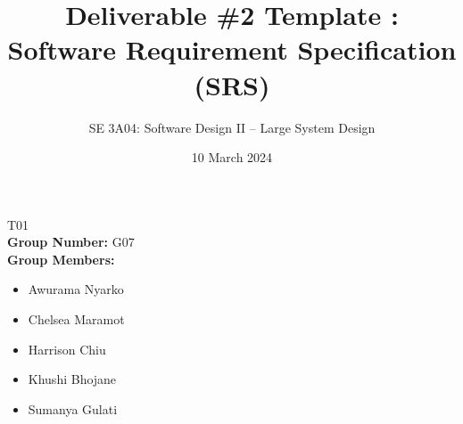 \documentclass[]{article}
\title{Deliverable \#2 Template : Software Requirement Specification (SRS)}
\author{SE 3A04: Software Design II -- Large System Design}
\date{10 March 2024}
\begin{document}
\maketitle
{} T01\\
{\bf Group Number:} G07 \\
{\bf Group Members:}
\begin{itemize}
	\item Awurama Nyarko
	\item Chelsea Maramot
	\item Harrison Chiu
	\item Khushi Bhojane
	\item Sumanya Gulati
\end{itemize}

\end{document}
